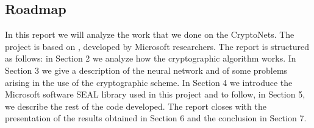\subsection{Roadmap}

In this report we will analyze the work that we done on the CryptoNets. The project is based on \cite{dowlin2016cryptonets}, developed by Microsoft researchers. The report is structured as follows: in Section 2 we analyze how the cryptographic algorithm works. In Section 3 we give a description of the neural network and of some problems arising in the use of the cryptographic scheme. In Section 4 we introduce the Microsoft software SEAL library used in this project and to follow, in Section 5, we describe the rest of the code developed. The report closes with the presentation of the results obtained in Section 6 and the conclusion in Section 7.